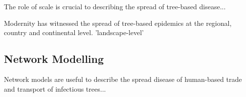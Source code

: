 The role of scale is crucial to describing the spread of tree-based disease...


Modernity has witnessed the spread of tree-based epidemics at the regional, country and continental level. 'landscape-level'


\subsection{Network Modelling}

Network models are useful to describe the spread disease of human-based trade and transport of infectious trees...



